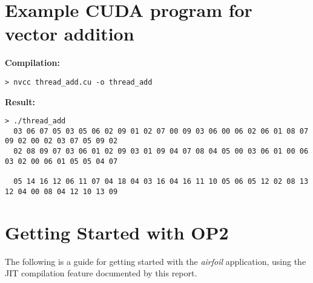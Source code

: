 
\appendixpage
\setcounter{section}{0}
\renewcommand{\thesection}{\Alph{section}}

\section{Example CUDA program for vector addition}
\label{app:cudaEx}

\vspace{-1em}
\begin{adjustwidth}{-.5in}{-.5in}
\textbf{Compilation:}
\begin{verbatim}
> nvcc thread_add.cu -o thread_add
\end{verbatim}
\textbf{Result:}
\begin{footnotesize}
\begin{verbatim}
> ./thread_add
  03 06 07 05 03 05 06 02 09 01 02 07 00 09 03 06 00 06 02 06 01 08 07 09 02 00 02 03 07 05 09 02
  02 08 09 07 03 06 01 02 09 03 01 09 04 07 08 04 05 00 03 06 01 00 06 03 02 00 06 01 05 05 04 07

  05 14 16 12 06 11 07 04 18 04 03 16 04 16 11 10 05 06 05 12 02 08 13 12 04 00 08 04 12 10 13 09
\end{verbatim}
\end{footnotesize}
\end{adjustwidth}


\section{Getting Started with OP2}
\label{app:getStart}
The following is a guide for getting started with the \textit{airfoil} application, using the JIT compilation feature documented by this report.

